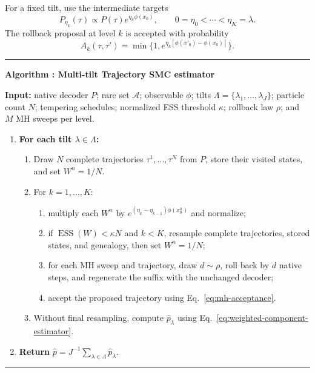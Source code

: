 \documentclass{article}
\newcommand{\ESS}{\operatorname{ESS}}
\newcounter{algorithm}
\begin{document}
For a fixed tilt, use the intermediate targets
\begin{equation}
P_{\eta_k}(\tau)\propto P(\tau)e^{\eta_k\phi(x_0)},
\qquad 0=\eta_0<\cdots<\eta_K=\lambda.
\label{eq:tempered-target}
\end{equation}
The rollback proposal at level $k$ is accepted with probability
\begin{equation}
A_k(\tau,\tau')
=\min\{1,e^{\eta_k[\phi(x'_0)-\phi(x_0)]}\}.
\label{eq:mh-acceptance}
\end{equation}

\label{alg:complete}
\noindent\rule{\linewidth}{0.5pt}
\noindent\textbf{Algorithm \thealgorithm: Multi-tilt Trajectory SMC estimator}

\smallskip
\noindent\textbf{Input:} native decoder $P$; rare set $\mathcal A$;
observable $\phi$; tilts $\Lambda=\{\lambda_1,\ldots,\lambda_J\}$; particle
count $N$; tempering schedules; normalized ESS threshold $\kappa$; rollback
law $\rho$; and $M$ MH sweeps per level.

\begin{enumerate}[leftmargin=*,label=\textbf{\arabic*.},itemsep=3pt,topsep=3pt]
    \item \textbf{For each tilt $\lambda\in\Lambda$:}
    \begin{enumerate}[leftmargin=2em,label=\alph*.,itemsep=2pt,topsep=2pt]
        \item Draw $N$ complete trajectories $\tau^1,\ldots,\tau^N$ from
        $P$, store their visited states, and set $W^n=1/N$.
        \item For $k=1,\ldots,K$:
        \begin{enumerate}[leftmargin=2em,label=\roman*.,itemsep=1pt,topsep=1pt]
            \item multiply each $W^n$ by
            $e^{(\eta_k-\eta_{k-1})\phi(x^n_0)}$ and normalize;
            \item if $\ESS(W)<\kappa N$ and $k<K$, resample complete
            trajectories, stored states, and genealogy, then set $W^n=1/N$;
            \item for each MH sweep and trajectory, draw $d\sim\rho$, roll
            back by $d$ native steps, and regenerate the suffix with the
            unchanged decoder;
            \item accept the proposed trajectory using
            Eq.~\eqref{eq:mh-acceptance}.
        \end{enumerate}
        \item Without final resampling, compute $\widehat p_\lambda$ using
        Eq.~\eqref{eq:weighted-component-estimator}.
    \end{enumerate}
    \item \textbf{Return}
    $\widehat p=J^{-1}\sum_{\lambda\in\Lambda}\widehat p_\lambda$.
\end{enumerate}
\noindent\rule{\linewidth}{0.5pt}
\end{document}
